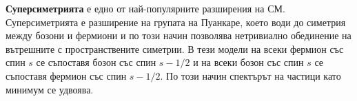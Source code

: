  
\par {\bf Суперсиметрията} \cite{susy1,susy2} е едно от най-популярните разширения на СМ. Суперсиметрията е разширение на групата на Пуанкаре, което води до симетрия между бозони и фермиони и по този начин позволява нетривиално обединение на вътрешните с пространствените симетрии. 
В тези модели на всеки фермион със спин $s$ се съпоставя бозон със спин $s-1/2$ и на всеки бозон със спин $s$ се съпоставя фермион със спин $s-1/2$. По този начин спектърът на частици като минимум се удвоява.


